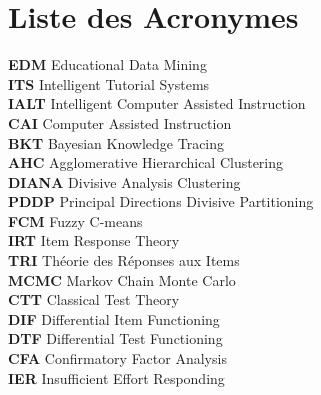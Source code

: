 \chapter*{Liste des Acronymes }
\textbf{EDM}\hspace{0.5cm}  Educational Data Mining\\
\textbf{ITS}\hspace{0.5cm}  Intelligent Tutorial Systems\\
\textbf{IALT}\hspace{0.5cm}  Intelligent Computer Assisted Instruction\\
\textbf{CAI}\hspace{0.5cm}  Computer Assisted Instruction\\
\textbf{BKT}\hspace{0.5cm}  Bayesian Knowledge Tracing\\
\textbf{AHC}\hspace{0.5cm}  Agglomerative Hierarchical Clustering\\
\textbf{DIANA}\hspace{0.5cm}  Divisive Analysis Clustering\\
\textbf{PDDP}\hspace{0.5cm}  Principal Directions Divisive Partitioning\\
\textbf{FCM}\hspace{0.5cm}  Fuzzy C-means\\
\textbf{IRT}\hspace{0.5cm}  Item Response Theory\\
\textbf{TRI}\hspace{0.5cm}  Théorie des Réponses aux Items\\
\textbf{MCMC}\hspace{0.5cm}  Markov Chain Monte Carlo\\
\textbf{CTT}\hspace{0.5cm}  Classical Test Theory\\
\textbf{DIF}\hspace{0.5cm}  Differential Item Functioning\\
\textbf{DTF}\hspace{0.5cm}  Differential Test Functioning\\
\textbf{CFA}\hspace{0.5cm}  Confirmatory Factor Analysis\\
\textbf{IER}\hspace{0.5cm}  Insufficient Effort Responding\\
